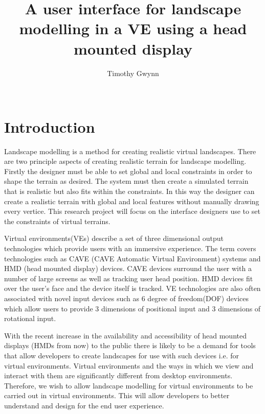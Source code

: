 \documentclass{sig-alternate-05-2015}
\begin{document}
\title{A user interface for landscape modelling in a VE using a head mounted display}

\author{
\alignauthor
Timothy Gwynn\\
       \\
}
\maketitle
\begin{CCSXML}

\end{CCSXML}



\printccsdesc
{}
\begin{abstract}
	
\end{abstract}
\section{Introduction}
Landscape modelling is a method for creating realistic virtual landscapes. There are two principle aspects of creating realistic terrain for landscape modelling. Firstly the designer must be able to set global and local constraints in order to shape the terrain as desired. The system must then create a simulated terrain that is realistic but also fits within the constraints. In this way the designer can create a realistic terrain with global and local features without manually drawing every vertice. This research project will focus on the interface designers use to set the constraints of virtual terrains.

Virtual environments(VEs) describe a set of three dimensional output technologies which provide users with an immersive experience. The term covers technologies such as CAVE (CAVE Automatic Virtual
Environment)  systems and HMD (head mounted display) devices.
CAVE devices surround the user with a number of large screens as well as tracking user head position\cite{Cruz-Neira1993}. HMD devices fit over the user's face and the device itself is tracked.
VE technologies are also often associated with novel input devices such as 6 degree of freedom(DOF) devices which allow users to provide 3 dimensions of positional input and 3 dimensions of rotational input.
 
 With the recent increase in the availability and accessibility of head mounted displays (HMDs from now) to the public there is likely to be a demand for tools that allow developers to create landscapes for use with such devices i.e. for virtual environments. Virtual environments and the ways in which we view and interact with them are significantly different from desktop environments. Therefore, we wish to allow landscape modelling for virtual environments to be carried out in virtual environments. This will allow developers to better understand and design for the end user experience.
\end{document}

